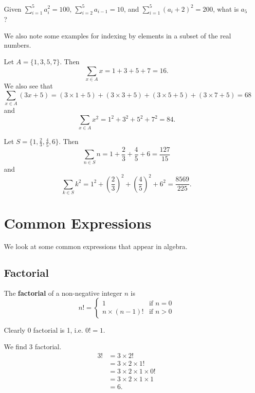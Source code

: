 \begin{exercise}
    Given $\displaystyle \sum_{i=1}^5a_i^2 = 100$, $\displaystyle \sum_{i=2}^5a_{i-1} = 10$, and $\displaystyle \sum_{i=1}^5(a_i+2)^2 = 200$, what is $a_5$?
\end{exercise}

We also note some examples for indexing by elements in a subset of the real numbers.
\begin{example}
    Let $A = \{1, 3, 5, 7\}$. Then
    \[
        \sum_{x \in A} x = 1 + 3 + 5 + 7 = 16.
    \]
    We also see that
    \[
        \sum_{x \in A}(3x + 5) = (3\times1 + 5) + (3\times3 + 5) + (3\times5 + 5) + (3\times7 + 5) = 68
    \]
    and
    \[
        \sum_{x\in A}x^2 = 1^2 + 3^2 + 5^2 + 7^2 = 84.
    \]
\end{example}
\begin{example}
    Let $S = \{1, \frac23, \frac45, 6\}$. Then
    \[
        \sum_{n \in S}n = 1 + \frac23 + \frac45 + 6 = \frac{127}{15}
    \]
    and
    \[
        \sum_{k \in S}k^2 = 1^2 + \left(\frac23\right)^2 + \left(\frac45\right)^2 + 6^2 = \frac{8569}{225}.
    \]
\end{example}

\newpage

\section{Common Expressions}
We look at some common expressions that appear in algebra.

\subsection{Factorial}
\begin{definition}
    The \textbf{factorial} of a non-negative integer $n$ is
    \[
        n! = \begin{cases}
            1 & \text{if } n = 0\\
            n \times (n-1)! & \text{if } n > 0
        \end{cases}
    \]
\end{definition}

\begin{example}
    Clearly 0 factorial is 1, i.e. $0! = 1$.
\end{example}

\begin{example}
    We find 3 factorial.
    \begin{align*}
        3! &= 3 \times 2!\\
        &= 3 \times 2 \times 1!\\
        &= 3 \times 2 \times 1 \times 0!\\
        &= 3 \times 2  \times 1  \times 1\\
        &= 6.
    \end{align*}
\end{example}

